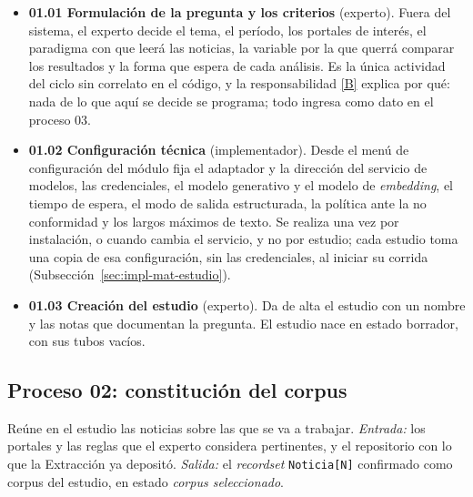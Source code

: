 \documentclass[12pt]{report}
\DeclareRobustCommand{\resp}[1]{\hyperref[tab:registro-responsabilidades]{\textcolor{respcolor}{[#1]}}}
\begin{document}
\begin{itemize}
  \item \textbf{01.01 Formulación de la pregunta y los criterios} (experto). Fuera del sistema, el experto decide el tema, el período, los portales de interés, el paradigma con que leerá las noticias, la variable por la que querrá comparar los resultados y la forma que espera de cada análisis. Es la única actividad del ciclo sin correlato en el código, y la responsabilidad \resp{B} explica por qué: nada de lo que aquí se decide se programa; todo ingresa como dato en el proceso 03.
  \item \textbf{01.02 Configuración técnica} (implementador). Desde el menú de configuración del módulo fija el adaptador y la dirección del servicio de modelos, las credenciales, el modelo generativo y el modelo de \textit{embedding}, el tiempo de espera, el modo de salida estructurada, la política ante la no conformidad y los largos máximos de texto. Se realiza una vez por instalación, o cuando cambia el servicio, y no por estudio; cada estudio toma una copia de esa configuración, sin las credenciales, al iniciar su corrida (Subsección~\ref{sec:impl-mat-estudio}).
  \item \textbf{01.03 Creación del estudio} (experto). Da de alta el estudio con un nombre y las notas que documentan la pregunta. El estudio nace en estado borrador, con sus tubos vacíos.
\end{itemize}

\subsection{Proceso 02: constitución del corpus}
\label{sec:proc-scraping}

Reúne en el estudio las noticias sobre las que se va a trabajar. \textit{Entrada:} los portales y las reglas que el experto considera pertinentes, y el repositorio con lo que la Extracción ya depositó. \textit{Salida:} el \textit{recordset} \texttt{Noticia[N]} confirmado como corpus del estudio, en estado \textit{corpus seleccionado}.
\end{document}
